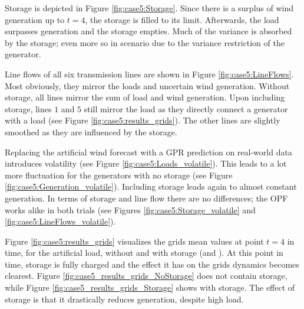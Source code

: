 \documentclass[final,3p,times,twocolumn]{elsarticle}  %
\newcommand{\todo}[1]{\textcolor{orange}{[#1]}}
\begin{document}
Storage is depicted in Figure \ref{fig:case5:Storage}. Since there is a surplus of wind generation up to $t=4$, the storage is filled to its limit. Afterwards, the load surpasses generation and the storage empties. Much of the variance is absorbed by the storage;  even more so in scenario \caseStorageWithVariance due to the variance restriction of the generator.

Line flows of all six transmission lines are shown in Figure \ref{fig:case5:LineFlows}. Most obviously, they mirror the loads and uncertain wind generation. 
Without storage, all lines mirror the sum of load and wind generation. 
Upon including storage, lines $1$ and $5$ still mirror the load as they directly connect a generator with a load (see Figure \ref{fig:case5:results_grids}). The other lines are slightly smoothed as they are influenced by the storage.

Replacing the artificial wind forecast with a GPR prediction on real-world data introduces volatility (see Figure \ref{fig:case5:Loads_volatile}).
This leads to a lot more fluctuation for the generators with no storage (see Figure \ref{fig:case5:Generation_volatile}). Including storage leads again to almost constant generation. In terms of storage and line flow there are no differences; the OPF works alike in both trials (see Figures \ref{fig:case5:Storage_volatile} and \ref{fig:case5:LineFlows_volatile}).

Figure \ref{fig:case5:results_grids} visualizes the grids mean values at point $t=4$ in time, for the artificial load, without and with storage (\caseNoStorage and \caseStorage). At this point in time, storage is fully charged and the effect it has on the grids dynamics becomes clearest. 
Figure \ref{fig:case5_results_grids_NoStorage} does not contain storage, while Figure \ref{fig:case5_results_grids_Storage} shows \caseNoStorage with storage.
The effect of storage is that it drastically reduces generation, despite high load.

\end{document}
